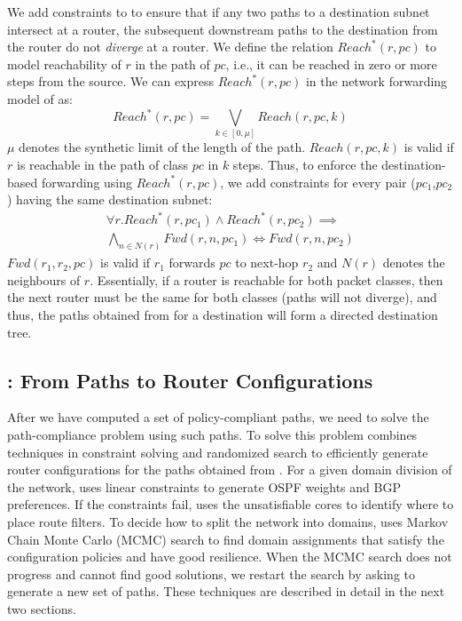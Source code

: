 We add constraints to \genesis to ensure that
if any two paths to a destination subnet intersect at a router,
the subsequent downstream paths to the destination from the
router do not \emph{diverge} at a router.  
We define the relation $Reach^*(r,pc)$ to model reachability 
of $r$ in the path of $pc$, i.e., it can be reached in zero or more
steps from the source. We can express $Reach^*(r,pc)$ 
in the network forwarding model of \genesis as:
\begin{equation}
	Reach^*(r,pc) = \bigvee_{k \in [0, \mu]} Reach(r, pc, k)
\end{equation}
$\mu$ denotes the synthetic limit of the length of the path. 
$Reach(r, pc, k)$ is valid if $r$ is reachable in the path of
class $pc$ in $k$ steps. Thus, to enforce the destination-based
forwarding using $Reach^*(r,pc)$, we add
constraints for every pair ($pc_1$,$pc_2$) having the same 
 destination subnet:
 \begin{multline}
 \forall r. Reach^*(r, pc_1) \wedge Reach^*(r, pc_2) 
 \implies \\ \bigwedge_{n \in N(r)} Fwd(r, n, pc_1) \Leftrightarrow Fwd(r, n, pc_2)
 \end{multline}
 $Fwd(r_1, r_2,pc)$ is valid if $r_1$ forwards $pc$ to next-hop $r_2$ and
 $N(r)$ denotes the neighbours of $r$. Essentially, 
 if a router is reachable for both packet classes, 
 then the next router must be the same for both classes
 (paths will not diverge), and thus, the paths obtained
 from \genesis for a destination will form a 
 directed destination tree. 

\subsection{\name: From Paths to Router Configurations} 
After we have computed a set of policy-compliant paths,
we need to solve the path-compliance problem using such paths.
To solve this problem \name
combines techniques in constraint solving and randomized search
to efficiently generate router configurations for the paths obtained from \genesis.
For a given domain division of the network,
\name uses linear constraints to generate OSPF weights and BGP preferences.
If the constraints fail, \name uses the unsatisfiable cores to
identify where to place route filters.
To decide how to split the network into domains,
\name uses Markov Chain Monte Carlo (MCMC) search to find
domain assignments that satisfy the configuration policies and have good resilience.
When the MCMC search does not progress and cannot find good solutions,
we restart the search by asking \genesis to generate a new set of paths.
These techniques are described in detail in the next two sections.

